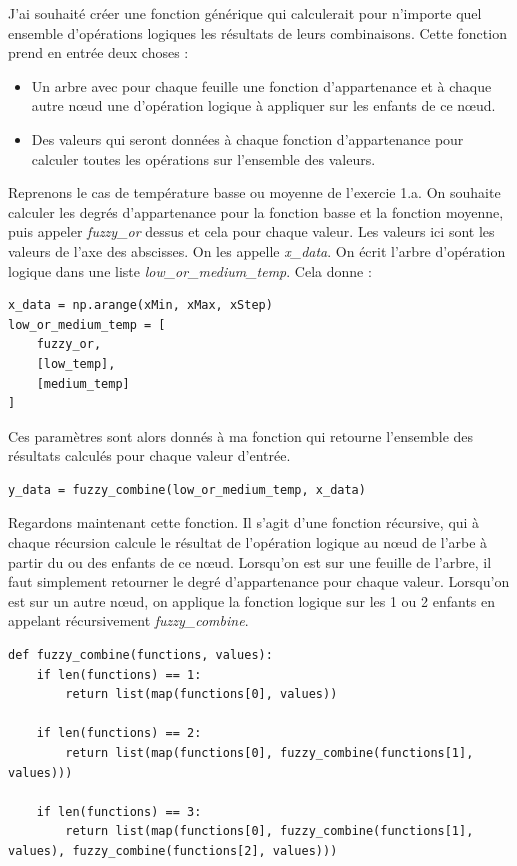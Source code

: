 \documentclass[11pt]{report}
\begin{document}
J'ai souhaité créer une fonction générique qui calculerait pour n'importe quel ensemble d'opérations logiques les résultats de leurs combinaisons. Cette fonction prend en entrée deux choses :\\
\begin{itemize}
\item Un arbre avec pour chaque feuille une fonction d'appartenance et à chaque autre nœud une d'opération logique à appliquer sur les enfants de ce nœud.
\item Des valeurs qui seront données à chaque fonction d'appartenance pour calculer toutes les opérations sur l'ensemble des valeurs.
\end{itemize}
Reprenons le cas de température basse ou moyenne de l'exercie 1.a. On souhaite calculer les degrés d'appartenance pour la fonction basse et la fonction moyenne, puis appeler \textit{fuzzy\_or} dessus et cela pour chaque valeur. Les valeurs ici sont les valeurs de l'axe des abscisses. On les appelle \textit{x\_data}. On écrit l'arbre d'opération logique dans une liste \textit{low\_or\_medium\_temp}. Cela donne :
\begin{verbatim}
x_data = np.arange(xMin, xMax, xStep)
low_or_medium_temp = [
    fuzzy_or,
    [low_temp],
    [medium_temp]
]
\end{verbatim}

Ces paramètres sont alors donnés à ma fonction qui retourne l'ensemble des résultats calculés pour chaque valeur d'entrée.
\begin{verbatim}
y_data = fuzzy_combine(low_or_medium_temp, x_data)
\end{verbatim}

Regardons maintenant cette fonction. Il s'agit d'une fonction récursive, qui à chaque récursion calcule le résultat de l'opération logique au nœud de l'arbe à partir du ou des enfants de ce nœud.
Lorsqu'on est sur une feuille de l'arbre, il faut simplement retourner le degré d'appartenance pour chaque valeur.
Lorsqu'on est sur un autre nœud, on applique la fonction logique sur les 1 ou 2 enfants en appelant récursivement \textit{fuzzy\_combine}.
\begin{verbatim}
def fuzzy_combine(functions, values):
    if len(functions) == 1:
        return list(map(functions[0], values))

    if len(functions) == 2:
        return list(map(functions[0], fuzzy_combine(functions[1], values)))

    if len(functions) == 3:
        return list(map(functions[0], fuzzy_combine(functions[1], values), fuzzy_combine(functions[2], values)))
\end{verbatim}
\end{document}
